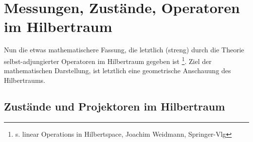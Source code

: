 \chapter{Messungen, Zustände, Operatoren im Hilbertraum}

Nun die etwas mathematischere Fassung, die letztlich (streng) durch die Theorie selbst-adjungier\-ter Operatoren im Hilbertraum gegeben ist \footnote{s. linear Operations in Hilbertspace, Joachim Weidmann, Springer-Vlg}. Ziel der mathematischen Darstellung, ist letztlich eine geometrische Anschauung des Hilbertraums.

\section{Zustände und Projektoren im Hilbertraum}

